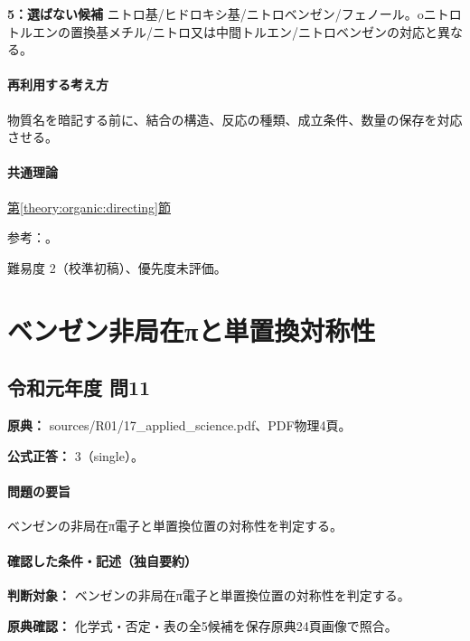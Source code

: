 \noindent\textbf{5：選ばない候補} ニトロ基/ヒドロキシ基/ニトロベンゼン/フェノール。oニトロトルエンの置換基メチル/ニトロ又は中間トルエン/ニトロベンゼンの対応と異なる。\par

\paragraph{再利用する考え方} 物質名を暗記する前に、結合の構造、反応の種類、成立条件、数量の保存を対応させる。

\paragraph{共通理論} \hyperref[theory:organic:directing]{第\ref*{theory:organic:directing}節}

\par 参考：\cite{organic_directing}。

\par 難易度 2（校準初稿）、優先度未評価。

\section{ベンゼン非局在πと単置換対称性}

\subsection{令和元年度 問11}
\label{q:r01-reg-applied-11}

\noindent\textbf{原典：} sources/R01/17\_applied\_science.pdf、PDF物理4頁。

\textbf{公式正答：} 3（single）。

\paragraph{問題の要旨} ベンゼンの非局在π電子と単置換位置の対称性を判定する。

\paragraph{確認した条件・記述（独自要約）}\mbox{}\par

\noindent\textbf{判断対象：} ベンゼンの非局在π電子と単置換位置の対称性を判定する。\par

\noindent\textbf{原典確認：} 化学式・否定・表の全5候補を保存原典24頁画像で照合。\par

